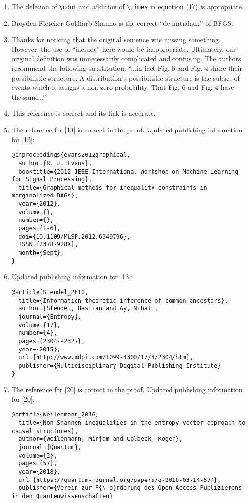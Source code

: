 \documentclass{article}
\begin{document}
\begin{enumerate}
        \item The deletion of \verb|\cdot| and addition of \verb|\times| in equation (17) is appropriate.
        \item Broyden-Fletcher-Goldfarb-Shanno is the correct ``de-initialism'' of BFGS.
        \item Thanks for noticing that the original sentence was missing something. However, the use of ``include'' here would be inappropriate. Ultimately, our original definition was unnecessarily complicated and confusing. The authors recommend the following substitution: ``...in fact Fig. 6 and Fig. 4 share their possibilistic structure. A distribution's possibilistic structure is the subset of events which it assigns a non-zero probability. That Fig. 6 and Fig. 4 have the same...''
        \item This reference is correct and its link is accurate.
        \item The reference for [13] is correct in the proof. Updated publishing information for [13]:
        \begin{verbatim}
@inproceedings{evans2012graphical,
  author={R. J. Evans},
  booktitle={2012 IEEE International Workshop on Machine Learning for Signal Processing},
  title={Graphical methods for inequality constraints in marginalized DAGs},
  year={2012},
  volume={},
  number={},
  pages={1-6},
  doi={10.1109/MLSP.2012.6349796},
  ISSN={2378-928X},
  month={Sept},
}
        \end{verbatim}
        \item Updated publishing information for [13]:
        \begin{verbatim}
@article{Steudel_2010,
  title={Information-theoretic inference of common ancestors},
  author={Steudel, Bastian and Ay, Nihat},
  journal={Entropy},
  volume={17},
  number={4},
  pages={2304--2327},
  year={2015},
  url={http://www.mdpi.com/1099-4300/17/4/2304/htm},
  publisher={Multidisciplinary Digital Publishing Institute}
}
        \end{verbatim}
        \item The reference for [20] is correct in the proof. Updated publishing information for [20]:
        \begin{verbatim}
@article{Weilenmann_2016,
  title={Non-Shannon inequalities in the entropy vector approach to causal structures},
  author={Weilenmann, Mirjam and Colbeck, Roger},
  journal={Quantum},
  volume={2},
  pages={57},
  year={2018},
  url={https://quantum-journal.org/papers/q-2018-03-14-57/},
  publisher={Verein zur F{\"o}rderung des Open Access Publizierens in den Quantenwissenschaften}

\end{verbatim}
\end{enumerate}
\end{document}
